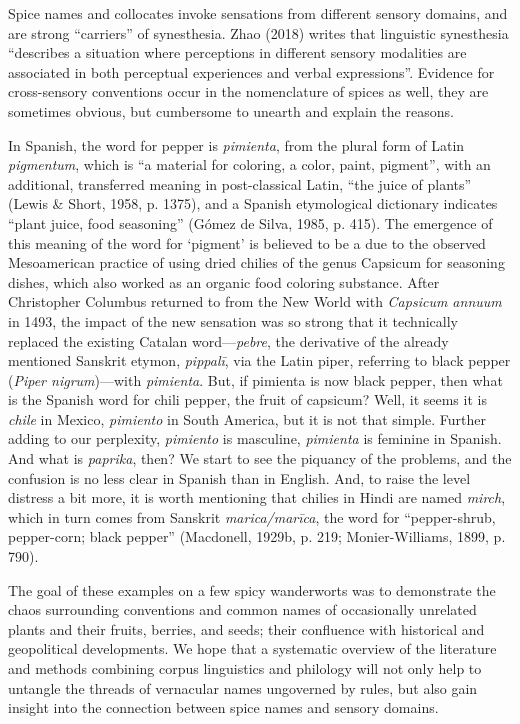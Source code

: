 Spice names and collocates invoke sensations from different sensory domains, and are strong ``carriers'' of synesthesia. Zhao (2018) writes that linguistic synesthesia ``describes a situation where perceptions in different sensory modalities are associated in both perceptual experiences and verbal expressions''. Evidence for cross-sensory conventions occur in the nomenclature of spices as well, they are sometimes obvious, but cumbersome to unearth and explain the reasons.

In Spanish, the word for pepper is \textit{pimienta}, from the plural form of Latin \textit{pigmentum}, which is ``a material for coloring, a color, paint, pigment'', with an additional, transferred meaning in post-classical Latin, ``the juice of plants'' (Lewis \& Short, 1958, p. 1375), and a Spanish etymological dictionary indicates ``plant juice, food seasoning'' (Gómez de Silva, 1985, p. 415). The emergence of this meaning of the word for `pigment' is believed to be a due to the observed Mesoamerican practice of using dried chilies of the genus Capsicum for seasoning dishes, which also worked as an organic food coloring substance. After Christopher Columbus returned to from the New World with \textit{Capsicum annuum} in 1493, the impact of the new sensation was so strong that it technically replaced the existing Catalan word---\textit{pebre}, the derivative of the already mentioned Sanskrit etymon, \textit{pippalī}, via the Latin piper, referring to black pepper (\textit{Piper nigrum})---with \textit{pimienta}. But, if pimienta is now black pepper, then what is the Spanish word for chili pepper, the fruit of capsicum? Well, it seems it is \textit{chile} in Mexico, \textit{pimiento} in South America, but it is not that simple. Further adding to our perplexity, \textit{pimiento} is masculine, \textit{pimienta} is feminine in Spanish. And what is \textit{paprika}, then? We start to see the piquancy of the problems, and the confusion is no less clear in Spanish than in English. And, to raise the level distress a bit more, it is worth mentioning that chilies in Hindi are named \textit{mirch}, which in turn comes from Sanskrit \textit{marica/marīca}, the word for ``pepper-shrub, pepper-corn; black pepper'' (Macdonell, 1929b, p. 219; Monier-Williams, 1899, p. 790).

The goal of these examples on a few spicy \glspl{wanderwort} was to demonstrate the chaos surrounding conventions and common names of occasionally unrelated plants and their fruits, berries, and seeds; their confluence with historical and geopolitical developments. We hope that a systematic overview of the literature and methods combining corpus linguistics and philology will not only help to untangle the threads of vernacular names ungoverned by rules, but also gain insight into the connection between spice names and sensory domains.

